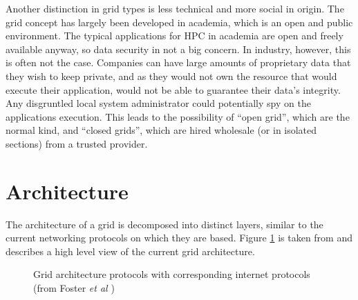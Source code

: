 Another distinction in grid types is less technical and more social in origin.
The grid concept has largely been developed in academia, which is an open and
public environment. The typical applications for HPC in academia are open and
freely available anyway, so data security in not a big concern. In industry,
however, this is often not the case. Companies can have large amounts of
proprietary data that they wish to keep private, and as they would not own the
resource that would execute their application, would not be able to guarantee
their data's integrity. Any disgruntled local system administrator could
potentially spy on the applications execution. This leads to the possibility
of ``open grid'', which are the normal kind, and ``closed grids'', which are
hired wholesale (or in isolated sections) from a trusted provider.








\section{Architecture}

The architecture of a grid is decomposed into distinct layers, similar to the
current networking protocols on which they are based.  Figure
\ref{FIG:GRID:ARCH} is taken from \cite{grid-foster01-anatomy} and describes a
high level view of the current grid architecture.

\vspace{1cm}
\begin{figure}[h] 
  \centering
  \caption{Grid architecture protocols with corresponding internet protocols
           (from Foster \textit{et al} \cite{grid-foster01-anatomy})} 
  \label{FIG:GRID:ARCH}
\end{figure}

